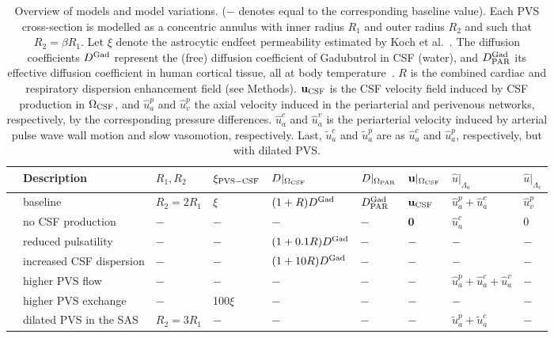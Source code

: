 \documentclass[fleqn,10pt]{wlscirep}
\begin{document}
\begin{table}
  \begin{center}
  \begin{tabular}{ll|llll|lll}
    \toprule
    & Description & $R_1, R_2$ & $\xi_{\rm PVS-CSF}$ & $D|_{\Omega_{\rm CSF}}$ & $D|_{\Omega_{\rm PAR}}$ & $\mathbf{u}|_{\Omega_{\rm CSF}}$ & $\hat{u}|_{\Lambda_a}$ & $\hat{u}|_{\Lambda_v}$  \\
    \midrule
     & baseline & $R_2 = 2 R_1$ & $\xi$ & $(1 + R) D^{\rm Gad}$ & $D^{\rm Gad}_{\rm PAR}$ & $\mathbf{u}_{\rm CSF}$ & $\hat{u}_a^p + \hat{u}_a^c$  & $\hat{u}_v^p$ \\ 
    & no CSF production & $-$ & $-$ & $-$ & $-$ & $\mathbf{0}$ & $\hat{u}_a^c$ & $0$ \\ 
    & reduced pulsatility & $-$ & $-$ & $ (1 + 0.1 R) D^{\rm Gad}$ & $-$ & $-$ & $-$  & $-$ \\ 
    & increased CSF dispersion & $-$ & $-$ & $ (1 + 10 R) D^{\rm Gad}$ & $-$ & $-$ & $-$  & $-$ \\ 
    & higher PVS flow & $-$ & $-$ & $-$ & $-$ & $-$ & $\hat{u}_a^p + \hat{u}_a^c + \hat{u}_a^v$  & $-$ \\ 
    & higher PVS exchange & $-$ & 100$\xi$  &  $-$ & $-$ & $-$ & $-$  & $-$ \\ 
    & dilated PVS in the SAS & $R_2 = 3 R_1$ & $-$ & $-$ & $-$ & $-$ & $\tilde{u}_a^p + \tilde{u}_a^c$  & $-$ \\ 
    \bottomrule
    \end{tabular}
    \end{center}
  \caption{Overview of models and model variations. ($-$ denotes equal
    to the corresponding baseline value). Each PVS cross-section is
    modelled as a concentric annulus with inner radius $R_1$ and outer
    radius $R_2$ and such that $R_2 = \beta R_1$. Let $\xi$ denote the
    astrocytic endfeet permeability estimated by Koch et
    al.~\cite{koch2023estimates}. The diffusion coefficients $D^{\rm
      Gad}$ represent the (free) diffusion coefficient of Gadubutrol
    in CSF (water), and $D^{\rm Gad}_{\rm PAR}$ its effective
    diffusion coefficient in human cortical tissue, all at body
    temperature~\cite{sykova2008diffusion, valnes2020apparent}. $R$ is
    the combined cardiac and respiratory dispersion enhancement field
    (see Methods). $\mathbf{u}_{\rm CSF}$ is the CSF velocity field
    induced by CSF production in $\Omega_{\rm CSF}$, and $\hat{u}_a^p$
    and $\hat{u}_v^p$ the axial velocity induced in the periarterial
    and perivenous networks, respectively, by the corresponding
    pressure differences. $\hat{u}_a^c$ and $\hat{u}_a^v$ is the
    periarterial velocity induced by arterial pulse wave wall motion
    and slow vasomotion, respectively. Last, $\tilde{u}_a^c$ and
    $\tilde{u}_a^p$ are as $\hat{u}_a^c$ and $\hat{u}_a^p$,
    respectively, but with dilated PVS. }
\label{tab:scenarios}
\end{table}
\end{document}
